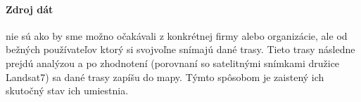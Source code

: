 \paragraph{Zdroj dát} nie sú ako by sme možno očakávali z konkrétnej firmy alebo organizácie, ale od bežných používateľov ktorý si svojvoľne snímajú dané trasy. Tieto trasy následne prejdú analýzou a po zhodnotení (porovnaní so satelitnými snímkami družice Landsat7) sa dané trasy zapíšu do mapy. Týmto spôsobom je zaistený ich skutočný stav ich umiestnia.

